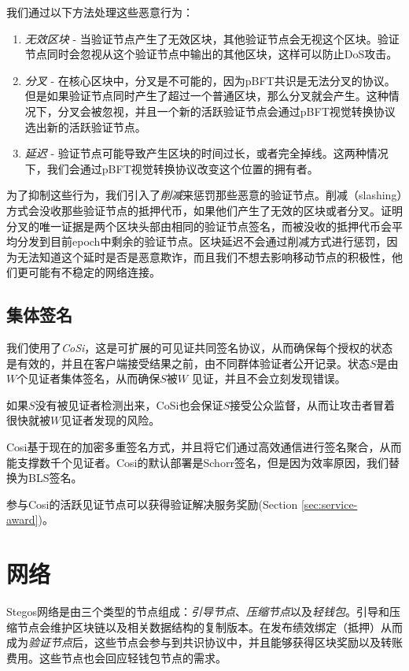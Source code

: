 \documentclass[8pt,fleqn,openany]{book}
\begin{document}
\begin{CJK*}{UTF8}{gbsn}
我们通过以下方法处理这些恶意行为：

\begin{enumerate}
	\item {\em 无效区块} - 当验证节点产生了无效区块，其他验证节点会无视这个区块。验证节点同时会忽视从这个验证节点中输出的其他区块，这样可以防止DoS攻击。
	\item {\em 分叉} - 在核心区块中，分叉是不可能的，因为pBFT共识是无法分叉的协议。但是如果验证节点同时产生了超过一个普通区块，那么分叉就会产生。这种情况下，分叉会被忽视，并且一个新的活跃验证节点会通过pBFT视觉转换协议选出新的活跃验证节点。 
	\item {\em 延迟} - 验证节点可能导致产生区块的时间过长，或者完全掉线。这两种情况下，我们会通过pBFT视觉转换协议改变这个位置的拥有者。 
\end{enumerate}

为了抑制这些行为，我们引入了\textit{削减}来惩罚那些恶意的验证节点。削减（slashing）方式会没收那些验证节点的抵押代币，如果他们产生了无效的区块或者分叉。证明分叉的唯一证据是两个区块头部由相同的验证节点签名，而被没收的抵押代币会平均分发到目前epoch中剩余的验证节点。区块延迟不会通过削减方式进行惩罚，因为无法知道这个延时是否是恶意欺诈，而且我们不想去影响移动节点的积极性，他们更可能有不稳定的网络连接。

\subsection{集体签名}
我们使用了\textit{CoSi}\cite{c10,c11}，这是可扩展的可见证共同签名协议，从而确保每个授权的状态是有效的，并且在客户端接受结果之前，由不同群体验证者公开记录。状态$S$是由$W$个见证者集体签名，从而确保$S$被$W$ 见证，并且不会立刻发现错误。

如果$S$没有被见证者检测出来，CoSi也会保证$S$接受公众监督，从而让攻击者冒着很快就被$W$见证者发现的风险。

Cosi基于现在的加密多重签名方式，并且将它们通过高效通信进行签名聚合，从而能支撑数千个见证者。Cosi的默认部署是Schorr签名，但是因为效率原因，我们替换为BLS签名。

参与Cosi的活跃见证节点可以获得验证解决服务奖励(Section \ref{sec:service-award})。

\section{网络}
Stegos网络是由三个类型的节点组成：\textit{引导节点}、\textit{压缩节点}以及\textit{轻钱包}。引导和压缩节点会维护区块链以及相关数据结构的复制版本。在发布绩效绑定（抵押）从而成为\textit{验证节点}后，这些节点会参与到共识协议中，并且能够获得区块奖励以及转账费用。这些节点也会回应轻钱包节点的需求。


\end{CJK*}
\end{document}
